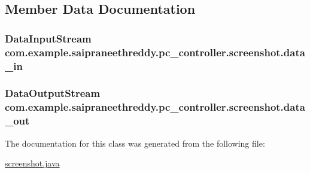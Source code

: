 \subsection{Member Data Documentation}
\subsubsection[{\texorpdfstring{data\+\_\+in}{data_in}}]{\setlength{\rightskip}{0pt plus 5cm}Data\+Input\+Stream com.\+example.\+saipraneethreddy.\+pc\+\_\+controller.\+screenshot.\+data\+\_\+in\hspace{0.3cm}{\ttfamily [package]}}\hypertarget{classcom_1_1example_1_1saipraneethreddy_1_1pc__controller_1_1screenshot_aa1a782d7935ea21272ea212aad1949b7}{}\label{classcom_1_1example_1_1saipraneethreddy_1_1pc__controller_1_1screenshot_aa1a782d7935ea21272ea212aad1949b7}
\subsubsection[{\texorpdfstring{data\+\_\+out}{data_out}}]{\setlength{\rightskip}{0pt plus 5cm}Data\+Output\+Stream com.\+example.\+saipraneethreddy.\+pc\+\_\+controller.\+screenshot.\+data\+\_\+out\hspace{0.3cm}{\ttfamily [package]}}\hypertarget{classcom_1_1example_1_1saipraneethreddy_1_1pc__controller_1_1screenshot_aabc5b106112eddb9f6a01d828957fa77}{}\label{classcom_1_1example_1_1saipraneethreddy_1_1pc__controller_1_1screenshot_aabc5b106112eddb9f6a01d828957fa77}


The documentation for this class was generated from the following file\+:\begin{DoxyCompactItemize}
\item 
\hyperlink{screenshot_8java}{screenshot.\+java}\end{DoxyCompactItemize}
